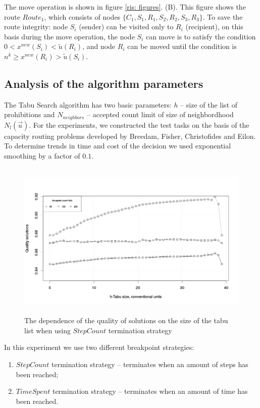\documentclass[]{TAACpaper}
\begin{document}
The move operation is shown in figure \ref{ris: figures}. (B). This figure shows the route $ Route_1 $, which consists of nodes $ \{C_1, S_1, R_1, S_2, R_2, S_3, R_3 \} $. To save the route integrity: node $S_i $ (sender) can be visited only to $ R_i $ (recipient), on this basis during the move operation, the node $ S_i $ can move is to satisfy the condition $ 0 < x^{new} ( S_i) < \widetilde{u} (R_i) $, and  node $R_i$ can be moved until the condition is $ n^k \geq x^{new} (R_i)> \widetilde{u} (S_i) $.


\subsection{Analysis of the algorithm parameters}
The Tabu Search algorithm has two basic parameters: $h$ -- size of the list of prohibitions and $N_{neighbors}$ -- accepted count limit of size of neighbordhood $N_l(\vec{u})$. For the experiments, we constructed the test tasks on the basis of the capacity routing problems developed by Breedam, Fisher, Christofides and Eilon. To determine trends in time and cost of the decision we used exponential smoothing by a factor of $0.1$.

\begin{figure}[h]
	\hfil\includegraphics[height=3.0in]{images/tabuSize_stepCount}\hfil
	\caption
	{
	  The dependence of the quality of solutions on the size of the tabu list when using $ StepCount $ termination strategy
	}
	\label{aba:fig2}
\end{figure}

In this experiment we use two different breakpoint strategies: 
\begin{enumerate}
	\item $StepCount$ termination strategy --  terminates when an amount of steps has been reached;
	\item $TimeSpent$ termination strategy -- terminates when an amount of time has been reached.
\end{enumerate}
\end{document}
